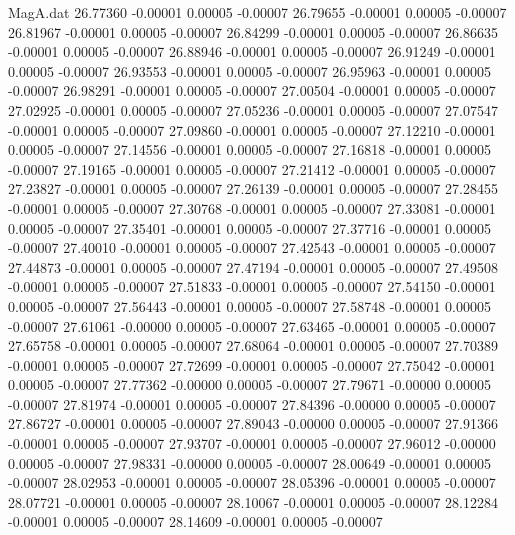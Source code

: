 \begin{filecontents}{MagA.dat}
  26.77360   -0.00001    0.00005   -0.00007
  26.79655   -0.00001    0.00005   -0.00007
  26.81967   -0.00001    0.00005   -0.00007
  26.84299   -0.00001    0.00005   -0.00007
  26.86635   -0.00001    0.00005   -0.00007
  26.88946   -0.00001    0.00005   -0.00007
  26.91249   -0.00001    0.00005   -0.00007
  26.93553   -0.00001    0.00005   -0.00007
  26.95963   -0.00001    0.00005   -0.00007
  26.98291   -0.00001    0.00005   -0.00007
  27.00504   -0.00001    0.00005   -0.00007
  27.02925   -0.00001    0.00005   -0.00007
  27.05236   -0.00001    0.00005   -0.00007
  27.07547   -0.00001    0.00005   -0.00007
  27.09860   -0.00001    0.00005   -0.00007
  27.12210   -0.00001    0.00005   -0.00007
  27.14556   -0.00001    0.00005   -0.00007
  27.16818   -0.00001    0.00005   -0.00007
  27.19165   -0.00001    0.00005   -0.00007
  27.21412   -0.00001    0.00005   -0.00007
  27.23827   -0.00001    0.00005   -0.00007
  27.26139   -0.00001    0.00005   -0.00007
  27.28455   -0.00001    0.00005   -0.00007
  27.30768   -0.00001    0.00005   -0.00007
  27.33081   -0.00001    0.00005   -0.00007
  27.35401   -0.00001    0.00005   -0.00007
  27.37716   -0.00001    0.00005   -0.00007
  27.40010   -0.00001    0.00005   -0.00007
  27.42543   -0.00001    0.00005   -0.00007
  27.44873   -0.00001    0.00005   -0.00007
  27.47194   -0.00001    0.00005   -0.00007
  27.49508   -0.00001    0.00005   -0.00007
  27.51833   -0.00001    0.00005   -0.00007
  27.54150   -0.00001    0.00005   -0.00007
  27.56443   -0.00001    0.00005   -0.00007
  27.58748   -0.00001    0.00005   -0.00007
  27.61061   -0.00000    0.00005   -0.00007
  27.63465   -0.00001    0.00005   -0.00007
  27.65758   -0.00001    0.00005   -0.00007
  27.68064   -0.00001    0.00005   -0.00007
  27.70389   -0.00001    0.00005   -0.00007
  27.72699   -0.00001    0.00005   -0.00007
  27.75042   -0.00001    0.00005   -0.00007
  27.77362   -0.00000    0.00005   -0.00007
  27.79671   -0.00000    0.00005   -0.00007
  27.81974   -0.00001    0.00005   -0.00007
  27.84396   -0.00000    0.00005   -0.00007
  27.86727   -0.00001    0.00005   -0.00007
  27.89043   -0.00000    0.00005   -0.00007
  27.91366   -0.00001    0.00005   -0.00007
  27.93707   -0.00001    0.00005   -0.00007
  27.96012   -0.00000    0.00005   -0.00007
  27.98331   -0.00000    0.00005   -0.00007
  28.00649   -0.00001    0.00005   -0.00007
  28.02953   -0.00001    0.00005   -0.00007
  28.05396   -0.00001    0.00005   -0.00007
  28.07721   -0.00001    0.00005   -0.00007
  28.10067   -0.00001    0.00005   -0.00007
  28.12284   -0.00001    0.00005   -0.00007
  28.14609   -0.00001    0.00005   -0.00007

\end{filecontents}
